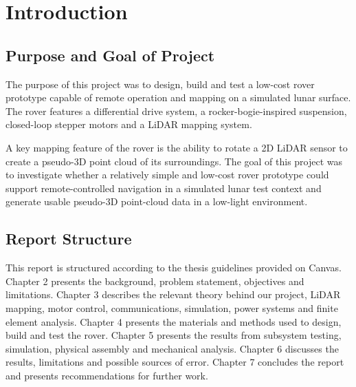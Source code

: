 \chapter{Introduction}

\section{Purpose and Goal of Project}

The purpose of this project was to design, build and test a low-cost rover prototype capable of remote operation and mapping on a simulated lunar surface. 
The rover features a differential drive system, a rocker-bogie-inspired suspension, closed-loop stepper motors and a LiDAR mapping system.

A key mapping feature of the rover is the ability to rotate a 2D LiDAR sensor to create a pseudo-3D point cloud of its surroundings. 
The goal of this project was to investigate whether a relatively simple and 
low-cost rover prototype could support remote-controlled navigation in a simulated lunar test context and generate usable pseudo-3D point-cloud data in a 
low-light environment.

\section{Report Structure}
This report is structured according to the thesis guidelines provided on Canvas. Chapter 2 presents the background, problem statement, objectives and limitations.
Chapter 3 describes the relevant theory behind our project, LiDAR mapping, motor control, communications, simulation, power systems and finite element analysis.
Chapter 4 presents the materials and methods used to design, build and test the rover.
Chapter 5 presents the results from subsystem testing, simulation, physical assembly and mechanical analysis.
Chapter 6 discusses the results, limitations and possible sources of error.
Chapter 7 concludes the report and presents recommendations for further work.
